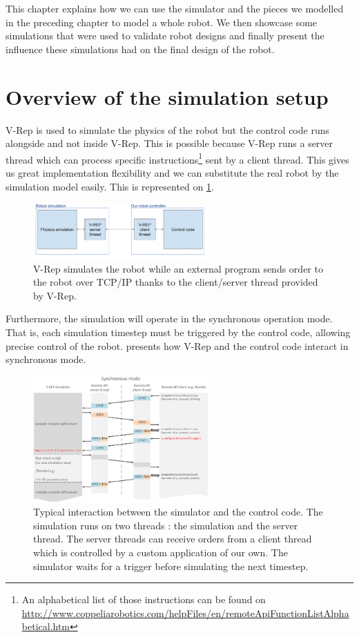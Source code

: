 This chapter explains how we can use the simulator and the pieces we modelled in the preceding chapter to model a whole robot. We then showcase some simulations that were used to validate robot designs and finally present the influence these simulations had on the final design of the robot. 

\section{Overview of the simulation setup}
V-Rep is used to simulate the physics of the robot but the control code runs alongside and not inside V-Rep. This is possible because V-Rep runs a server thread which can process specific instructions\footnote{An alphabetical list of those instructions can be found on \url{http://www.coppeliarobotics.com/helpFiles/en/remoteApiFunctionListAlphabetical.htm}} sent by a client thread. This gives us great implementation flexibility and we can substitute the real robot by the simulation model easily. This is represented on \cref{fig:simulation_principles}.

\begin{figure}[htp]
\center
\includegraphics[width=0.6\textwidth]{figures/simulation_principles}
\caption[Simulation principles]{V-Rep simulates the robot while an external program sends order to the robot over TCP/IP thanks to the client/server thread provided by V-Rep.}
\label{fig:simulation_principles}
\end{figure}

Furthermore, the simulation will operate in the synchronous operation mode. That is, each simulation timestep must be triggered by the control code, allowing precise control of the robot.  presents how V-Rep and the control code interact in synchronous mode.

\begin{figure}[htp]
\center
\includegraphics[width=0.6\textwidth]{figures/remoteApiSynchronous}
\caption[Simulation interaction]{Typical interaction between the simulator and the control code. The simulation runs on two threads : the simulation and the server thread. The server threads can receive orders from a client thread which is controlled by a custom application of our own. The simulator waits for a trigger before simulating the next timestep.}
\label{fig:remoteApi}
\end{figure}


